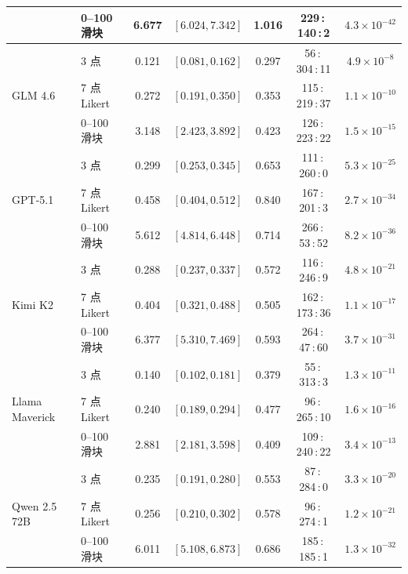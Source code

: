 \documentclass[UTF8,12pt]{ctexart}
\begin{document}
\begin{table}[htbp]
\begin{tabular}{llccccc}
            & 0--100 滑块 & 6.677 & $[6.024, 7.342]$ & 1.016 & 229\,:\,140\,:\,2   & $4.3\!\times\!10^{-42}$ \\
        \midrule
        \multirow{3}{*}{GLM 4.6}
            & 3 点        & 0.121 & $[0.081, 0.162]$ & 0.297 & 56\,:\,304\,:\,11   & $4.9\!\times\!10^{-8}$  \\
            & 7 点 Likert & 0.272 & $[0.191, 0.350]$ & 0.353 & 115\,:\,219\,:\,37  & $1.1\!\times\!10^{-10}$ \\
            & 0--100 滑块 & 3.148 & $[2.423, 3.892]$ & 0.423 & 126\,:\,223\,:\,22  & $1.5\!\times\!10^{-15}$ \\
        \midrule
        \multirow{3}{*}{GPT-5.1}
            & 3 点        & 0.299 & $[0.253, 0.345]$ & 0.653 & 111\,:\,260\,:\,0   & $5.3\!\times\!10^{-25}$ \\
            & 7 点 Likert & 0.458 & $[0.404, 0.512]$ & 0.840 & 167\,:\,201\,:\,3   & $2.7\!\times\!10^{-34}$ \\
            & 0--100 滑块 & 5.612 & $[4.814, 6.448]$ & 0.714 & 266\,:\,53\,:\,52   & $8.2\!\times\!10^{-36}$ \\
        \midrule
        \multirow{3}{*}{Kimi K2}
            & 3 点        & 0.288 & $[0.237, 0.337]$ & 0.572 & 116\,:\,246\,:\,9   & $4.8\!\times\!10^{-21}$ \\
            & 7 点 Likert & 0.404 & $[0.321, 0.488]$ & 0.505 & 162\,:\,173\,:\,36  & $1.1\!\times\!10^{-17}$ \\
            & 0--100 滑块 & 6.377 & $[5.310, 7.469]$ & 0.593 & 264\,:\,47\,:\,60   & $3.7\!\times\!10^{-31}$ \\
        \midrule
        \multirow{3}{*}{Llama Maverick}
            & 3 点        & 0.140 & $[0.102, 0.181]$ & 0.379 & 55\,:\,313\,:\,3    & $1.3\!\times\!10^{-11}$ \\
            & 7 点 Likert & 0.240 & $[0.189, 0.294]$ & 0.477 & 96\,:\,265\,:\,10   & $1.6\!\times\!10^{-16}$ \\
            & 0--100 滑块 & 2.881 & $[2.181, 3.598]$ & 0.409 & 109\,:\,240\,:\,22  & $3.4\!\times\!10^{-13}$ \\
        \midrule
        \multirow{3}{*}{Qwen 2.5 72B}
            & 3 点        & 0.235 & $[0.191, 0.280]$ & 0.553 & 87\,:\,284\,:\,0    & $3.3\!\times\!10^{-20}$ \\
            & 7 点 Likert & 0.256 & $[0.210, 0.302]$ & 0.578 & 96\,:\,274\,:\,1    & $1.2\!\times\!10^{-21}$ \\
            & 0--100 滑块 & 6.011 & $[5.108, 6.873]$ & 0.686 & 185\,:\,185\,:\,1   & $1.3\!\times\!10^{-32}$ \\
        \bottomrule
    \end{tabular}
\end{table}
\end{document}

